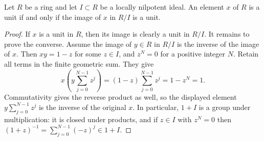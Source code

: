 \begin{lemma}
\label{editorial-source-lemma-locally-nilpotent-unit}
Let $R$ be a ring and let $I \subset R$ be a locally nilpotent
ideal.
An element $x$ of $R$ is a unit if and only if the image of $x$
in $R/I$ is a unit.
\end{lemma}

\begin{proof}
If $x$ is a unit in $R$, then its image is clearly a unit in $R/I$.
It remains to prove the converse.
Assume the image of $y \in R$ in $R/I$ is the inverse of the image of $x$.
Then $xy=1-z$ for some $z\in I$, and $z^N=0$ for a positive
integer $N$. Retain all terms in the finite geometric sum. They give
$$
x\left(y\sum_{j=0}^{N-1}z^j\right)
=(1-z)\sum_{j=0}^{N-1}z^j=1-z^N=1.
$$
Commutativity gives the reverse product as well, so the displayed
element $y\sum_{j=0}^{N-1}z^j$ is the inverse of the original $x$.
In particular, $1+I$ is a group under multiplication: it is closed
under products, and if $z\in I$ with $z^N=0$ then
$(1+z)^{-1}=\sum_{j=0}^{N-1}(-z)^j\in1+I$.
\end{proof}